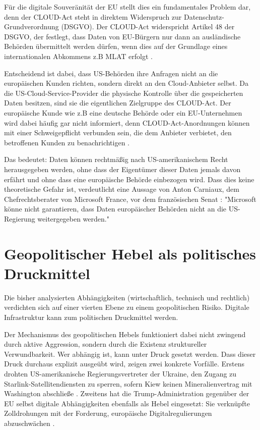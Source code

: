 Für die digitale Souveränität der \ac{EU} stellt dies ein fundamentales 
Problem dar, denn der \ac{CLOUD-Act} steht in direktem Widerspruch zur 
Datenschutz-Grundverordnung (DSGVO). Der \ac{CLOUD-Act} widerspricht 
Artikel 48 der DSGVO, der festlegt, dass Daten von EU-Bürgern nur dann 
an ausländische Behörden übermittelt werden dürfen, wenn dies auf der 
Grundlage eines internationalen Abkommens z.B MLAT erfolgt \cite{gdpr2016}.

Entscheidend ist dabei, dass US-Behörden ihre Anfragen nicht an die 
europäischen Kunden richten, sondern direkt an den Cloud-Anbieter selbst. 
Da die US-Cloud-Service-Provider die physische Kontrolle über die gespeicherten 
Daten besitzen, sind sie die eigentlichen Zielgruppe des \ac{CLOUD-Act}. Der 
europäische Kunde wie z.B eine deutsche Behörde oder ein EU-Unternehmen 
wird dabei häufig gar nicht informiert, denn \ac{CLOUD-Act}-Anordnungen können 
mit einer Schweigepflicht verbunden sein, die dem Anbieter verbietet, den 
betroffenen Kunden zu benachrichtigen \cite{lawfare2025dataproxy}. 

Das bedeutet: Daten können rechtmäßig 
nach US-amerikanischem Recht herausgegeben werden, ohne dass der Eigentümer 
dieser Daten jemals davon erfährt und ohne dass eine europäische Behörde 
einbezogen wird. Dass dies keine theoretische Gefahr ist, verdeutlicht eine 
Aussage von Anton Carniaux, dem Chefrechtsberater von Microsoft France, vor 
dem französischen Senat \cite{register2025microsoft}: "Microsoft könne nicht garantieren, dass Daten 
europäischer Behörden nicht an die US-Regierung weitergegeben werden."

\section{Geopolitischer Hebel als politisches Druckmittel}
\label{sec:geopolitischerhebel}
Die bisher analysierten Abhängigkeiten (wirtschaftlich, technisch und 
rechtlich) verdichten sich auf einer vierten Ebene zu einem 
geopolitischen Risiko. Digitale Infrastruktur kann zum politischen 
Druckmittel werden.

Der Mechanismus des geopolitischen Hebels funktioniert dabei nicht 
zwingend durch aktive Aggression, sondern durch die Existenz 
struktureller Verwundbarkeit. Wer abhängig ist, kann unter Druck gesetzt 
werden. Dass 
dieser Druck durchaus explizit ausgeübt wird, zeigen zwei 
konkrete Vorfälle. Erstens drohten US-amerikanische Regierungsvertreter 
der Ukraine, den Zugang zu Starlink-Satellitendiensten zu sperren, 
sofern Kiew keinen Mineralienvertrag mit Washington abschließe \cite{berliner2025starlink}. 
Zweitens hat die Trump-Administration gegenüber der \ac{EU} selbst digitale 
Abhängigkeiten ebenfalls als Hebel eingesetzt: Sie verknüpfte 
Zolldrohungen mit der Forderung, europäische Digitalregulierungen abzuschwächen \cite{cnbc2025trump}. 

